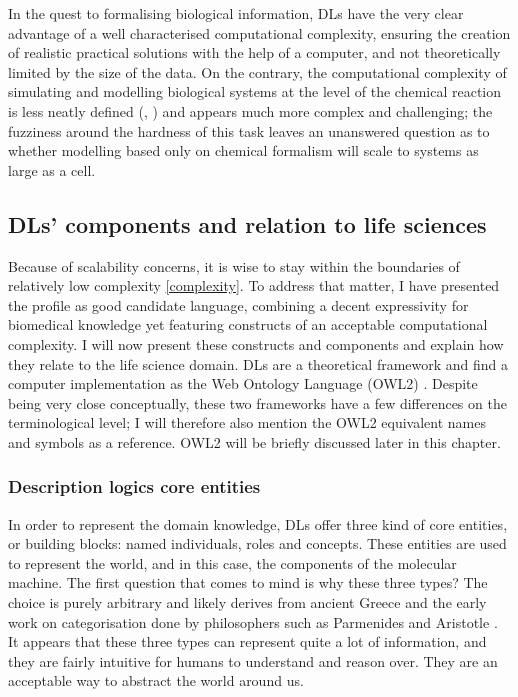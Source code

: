In the quest to formalising biological information, DLs have the very clear advantage of a well characterised computational complexity, ensuring the creation of realistic practical solutions with the help of a computer, and not theoretically limited by the size of the data. On the contrary, the computational complexity of simulating and modelling biological systems at the level of the chemical reaction is less neatly defined (\cite{meng2004modeling}, \cite{gillespie2007stochastic}) and appears much more complex and challenging; the fuzziness around the hardness of this task leaves an unanswered question as to whether modelling based only on chemical formalism will scale to systems as large as a cell.

\subsection{DLs' components and relation to life sciences}

Because of scalability concerns, it is wise to stay within the boundaries of relatively low complexity \ref{complexity}. To address that matter, I have presented the  profile as good candidate language, combining a decent expressivity for biomedical knowledge yet featuring constructs of an acceptable computational complexity. I will now present these constructs and components and explain how they relate to the life science domain. DLs are a theoretical framework and find a computer implementation as the Web Ontology Language (OWL2) \citep{owlw3c}. Despite being very close conceptually, these two frameworks have a few differences on the terminological level; I will therefore also mention the OWL2 equivalent names and symbols as a reference. OWL2 will be briefly discussed later in this chapter.

\subsubsection{Description logics core entities}
\label{coredl}

In order to represent the domain knowledge, DLs offer three kind of core entities, or building blocks: named individuals, roles and concepts. These entities are used to represent the world, and in this case, the components of the molecular machine. The first question that comes to mind is why these three types? The choice is purely arbitrary and likely derives from ancient Greece and the early work on categorisation done by philosophers such as Parmenides and Aristotle \citep{ontologywiki}. It appears that these three types can represent quite a lot of information, and they are fairly intuitive for humans to understand and reason over. They are an acceptable way to abstract the world around us.

